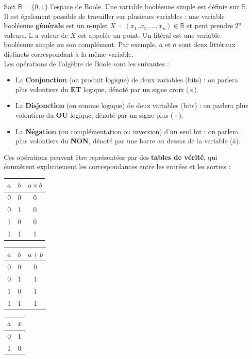 Soit $\mathbb{B}=\{0,1\}$ l'espace de Boole. Une variable booléenne simple est définie sur $\mathbb{B}.$
Il est également possible de travailler sur plusieurs variables : une variable booléenne {\bf générale} est un n-uplet $X=(x_1,x_2,\dots,x_n) \in \mathbb{B}$ et peut prendre $2^n$ valeurs. L
a valeur de $X$ est appelée un point. Un litéral est une variable booléenne simple ou son complément. Par exemple, $a$ et $\overline{a}$ sont deux littéraux distincts correspondant à la même
 variable.\\

Les opérations de l'algèbre de Boole sont les suivantes :
\begin{itemize}
\item La {\bf Conjonction} (ou produit logique) de deux variables (bits) : on parlera plus volontiers du {\bf ET} logique, dénoté par un signe croix ($\times$).
\item La {\bf Disjonction} (ou somme logique) de deux variables (bits) : on parlera plus volontiers du {\bf OU} logique, dénoté par un signe plus ($+$).
\item La {\bf Négation} (ou complémentation ou inversion) d'un seul bit : on parlera plus volontiers du {\bf NON}, dénoté par une barre au dessus de la variable ($\bar a$).
\end{itemize}

Ces opérations peuvent être représentées par des {\bf tables de vérité}, qui énumèrent explicitement les correspondances entre les entrées et les sorties :

\begin{center}
\begin{tabular}{|c c|c|}
  \hline
  $a$ & $b$  & $a \times b$ \\
  \hline
  0 & 0 & 0 \\
  0 & 1 & 0 \\
  1 & 0 & 0 \\
  1 & 1 & 1 \\
  \hline
\end{tabular}
\quad
\begin{tabular}{|c c|c|}
  \hline
  $a$ & $b$  & $a + b$ \\
  \hline
  0 & 0 & 0 \\
  0 & 1 & 1 \\
  1 & 0 & 1 \\
  1 & 1 & 1 \\
  \hline
\end{tabular}
\quad
\begin{tabular}{|c|c|}
  \hline
  $a$ & $\bar{x}$ \\
  \hline
  0 & 1 \\
  1 & 0 \\
  \hline
\end{tabular}
\end{center}

